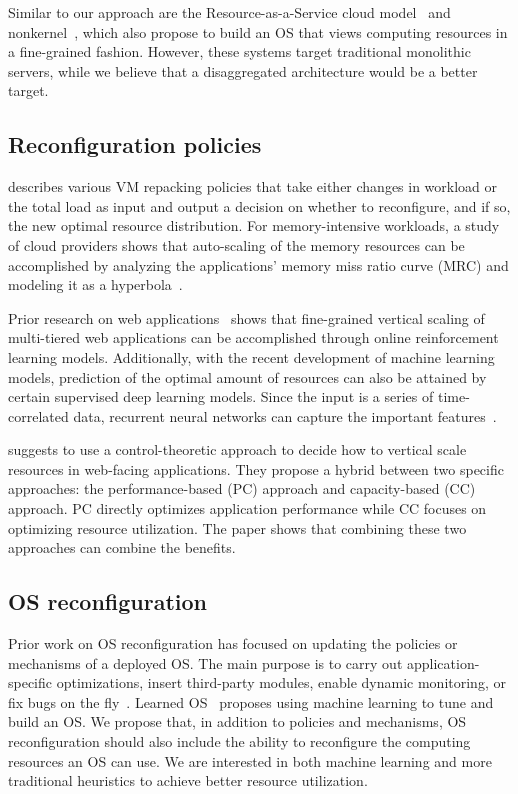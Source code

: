 Similar to our approach are the Resource-as-a-Service cloud
model~\cite{ben2012resource} and nonkernel~\cite{ben2013nonkernel},
which also propose to build an OS that views computing resources
in a fine-grained fashion.  However, these systems target traditional
monolithic servers, while we believe that a disaggregated architecture
would be a better target.


\subsection{Reconfiguration policies}
\cite{sedaghat2013virtual} describes various VM repacking
policies that take either changes in workload or the
total load as input and output a decision on whether to reconfigure,
and if so, the new optimal resource distribution.
For memory-intensive workloads, a study of cloud providers shows that
auto-scaling of the memory resources can be accomplished by analyzing the
applications' memory miss ratio curve (MRC) and modeling it as a
hyperbola~\cite{novak2020auto}.

Prior research on web applications~\cite{yazdanov2014lightweight}
shows that fine-grained vertical scaling of multi-tiered web
applications can be accomplished through online reinforcement learning
models.  Additionally, with the recent development of machine
learning models, prediction of the optimal amount of
resources can also be attained by certain supervised deep learning
models.  Since the input is a series of time-correlated data,
recurrent neural networks can capture the important
features~\cite{gers1999learning}.

\cite{farokhi2016hybrid} suggests to use a control-theoretic
approach to decide how to vertical scale resources in web-facing
applications.
They propose a hybrid between two specific approaches:
the performance-based (PC) approach and capacity-based (CC) approach.
PC directly optimizes application performance while CC focuses on
optimizing resource utilization.  The paper shows that
combining these two approaches can combine the benefits.

\subsection{OS reconfiguration}
Prior work on OS reconfiguration has focused on updating the
policies or mechanisms of a deployed OS. The main purpose is to
carry out application-specific optimizations, insert third-party
modules, enable dynamic monitoring, or fix bugs on the
fly~\cite{soules2003system, baumann2007reboots, baumann2005providing,
chen2006live, chen2007polus}. Learned OS~\cite{zhang2019learned}
proposes using machine learning to tune and build an OS. We propose
that, in addition to policies and mechanisms, OS reconfiguration
should also include the ability to reconfigure the computing resources
an OS can use.  We are interested in both machine learning and more
traditional heuristics to achieve better resource utilization.

